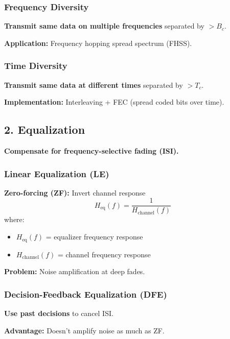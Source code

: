 \subsubsection{Frequency Diversity}

\textbf{Transmit same data on multiple frequencies} separated by $> B_c$.

\textbf{Application:} Frequency hopping spread spectrum (FHSS).

\subsubsection{Time Diversity}

\textbf{Transmit same data at different times} separated by $> T_c$.

\textbf{Implementation:} Interleaving + FEC (spread coded bits over time).

\subsection{2. Equalization}

\textbf{Compensate for frequency-selective fading (ISI).}

\subsubsection{Linear Equalization (LE)}

\textbf{Zero-forcing (ZF):} Invert channel response
\begin{equation}
H_{\text{eq}}(f) = \frac{1}{H_{\text{channel}}(f)}
\label{eq:zero-forcing}
\end{equation}
where:
\begin{itemize}
\item $H_{\text{eq}}(f)$ = equalizer frequency response
\item $H_{\text{channel}}(f)$ = channel frequency response
\end{itemize}

\textbf{Problem:} Noise amplification at deep fades.

\subsubsection{Decision-Feedback Equalization (DFE)}

\textbf{Use past decisions} to cancel ISI.

\textbf{Advantage:} Doesn't amplify noise as much as ZF.

